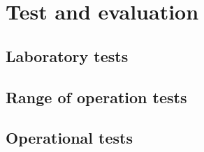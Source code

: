 \chapter{Test and evaluation}

\section{Laboratory tests}

\section{Range of operation tests}

\section{Operational tests}
